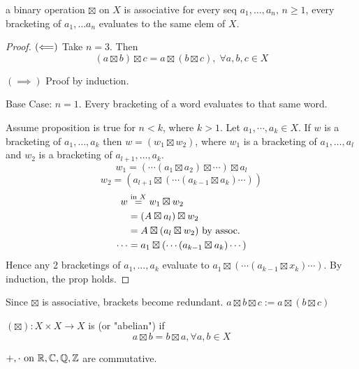 \documentclass[12pt]{article}
\newcommand{\gop}[0]{\boxtimes}
\begin{document}
\bbox
\begin{prop}
  a binary operation \(\gop\) on \(X\) is associative  for every
  seq \(a_1,\dots,a_n,\,n\ge 1\), every bracketing of \(a_1,\dots a_n\) 
  evaluates to the same elem of \(X\).
\end{prop}
\ebox

\bboxproof
\begin{proof}
  \((\Longleftarrow)\) Take \(n=3\). Then
  \[(a\gop b)\gop c=a\gop(b\gop c),\;\forall a,b,c\in X\]

  \((\implies)\) Proof by induction.

  Base Case: \(n=1\). Every bracketing of a word evaluates to that same word.
  
  Assume proposition is true for \(n<k\), where \(k>1\). Let \(a_1,\cdots,a_k
  \in X\). If \(w\) is a bracketing of \(a_1,\dots,a_k\) then
  \(w=(w_1\gop w_2)\), where
  \(w_1\) is a bracketing of \(a_1,\dots,a_l\) and \(w_2\) is a bracketing of
  \(a_{l+1},\dots,a_k\).
  \[w_1=(\cdots(a_1\gop a_2)\gop\cdots)\gop a_l\]
  \[w_2=(a_{l+1}\gop(\cdots(a_{k-1}\gop a_k)\cdots))\]
  \begin{equation*}
    \begin{split}
      w&\overset{\T{in }X}=w_1\gop w_2\\
       &=(A\gop a_l)\gop w_2\\
       &=A\gop(a_l\gop w_2)\T{ by assoc.}\\
      \cdots&= a_1\gop(\cdots(a_{k-1}\gop a_k)\cdots)
    \end{split}
  \end{equation*}
  Hence any 2 bracketings of \(a_1,\dots,a_k\) evaluate to \(a_1\gop
  (\cdots(a_{k-1}\gop x_k)\cdots)\). By induction, the prop holds.
\end{proof}
\ebox


\bboxnote
\begin{nota}\label{nota:bad_bracks}
  Since \(\gop\) is associative, brackets become
  redundant. \(a\gop b\gop c:=
  a\gop(b\gop c)\)
\end{nota}
\ebox


\bbox
\begin{defn}[Commutative] \label{defn:comm}
  \((\gop):X\times X\to X\) is  (or "abelian") if
  \[a\gop b=b\gop a,\forall a,b\in X\]
\end{defn}
\ebox

\bboxex
\(+,\cdot\text{ on }\mathbb R,\mathbb C,\mathbb Q,\mathbb Z\) are commutative. 
\ebox
\end{document}
